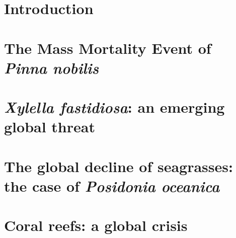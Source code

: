 \setcounter{page}{0}

\section{\label{sec:Introduction_1} Introduction}

\section{\label{sec:The Mass Mortality Event of Pinna nobilis} The Mass
  Mortality Event of \textit{Pinna nobilis}}

\section{\label{sec:Xylella fastidiosa: an emerging global
    threat}\textit{Xylella
    fastidiosa}: an emerging global threat}

\section{\label{sec:The global decline of seagrasses: the case of Posidonia
    oceanica} The global decline of seagrasses: the case of
  \textit{Posidonia
    oceanica}}

\section{\label{sec:Coral reefs: a global crisis} Coral reefs: a global crisis}
